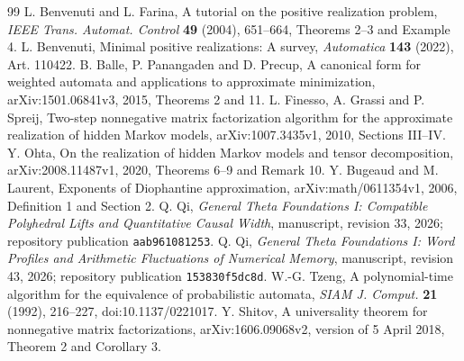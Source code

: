 \begin{thebibliography}{99}
 L. Benvenuti and L. Farina,
A tutorial on the positive realization problem,
\emph{IEEE Trans. Automat. Control} \textbf{49} (2004), 651--664,
Theorems 2--3 and Example 4.
 L. Benvenuti,
Minimal positive realizations: A survey,
\emph{Automatica} \textbf{143} (2022), Art. 110422.
 B. Balle, P. Panangaden and D. Precup,
A canonical form for weighted automata and applications to approximate minimization,
arXiv:1501.06841v3, 2015, Theorems 2 and 11.
 L. Finesso, A. Grassi and P. Spreij,
Two-step nonnegative matrix factorization algorithm for the approximate realization of hidden Markov models,
arXiv:1007.3435v1, 2010, Sections III--IV.
 Y. Ohta,
On the realization of hidden Markov models and tensor decomposition,
arXiv:2008.11487v1, 2020, Theorems 6--9 and Remark 10.
 Y. Bugeaud and M. Laurent,
Exponents of Diophantine approximation,
arXiv:math/0611354v1, 2006, Definition 1 and Section 2.
 Q. Qi,
\emph{General Theta Foundations I: Compatible Polyhedral Lifts and Quantitative Causal Width},
manuscript, revision 33, 2026; repository publication \texttt{aab961081253}.
 Q. Qi,
\emph{General Theta Foundations I: Word Profiles and Arithmetic Fluctuations of Numerical Memory},
manuscript, revision 43, 2026; repository publication \texttt{153830f5dc8d}.
 W.-G. Tzeng,
A polynomial-time algorithm for the equivalence of probabilistic automata,
\emph{SIAM J. Comput.} \textbf{21} (1992), 216--227,
doi:10.1137/0221017.
 Y. Shitov,
A universality theorem for nonnegative matrix factorizations,
arXiv:1606.09068v2, version of 5 April 2018, Theorem 2 and Corollary 3.
\end{thebibliography}
